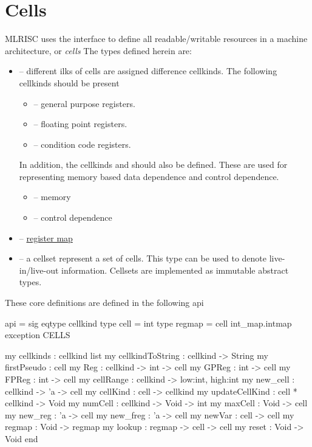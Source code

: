 \section{Cells}

MLRISC uses
the  
interface to define all readable/writable resources
in a machine architecture,  or \emph{cells} 
The types defined herein are:
\begin{itemize}
 \item {} -- different ilks of cells are assigned
   difference cellkinds.  The following cellkinds should be present
   \begin{itemize}
     \item {} -- general purpose registers.
     \item {} -- floating point registers.
     \item {} -- condition code registers.
   \end{itemize}
   In addition, the cellkinds  and 
   should also be defined.  These are used for representing
   memory based data dependence and control dependence.
   \begin{itemize}
     \item {} -- memory 
     \item {} -- control dependence
   \end{itemize} 
 \item {} -- \href{regmap.html}{register map}
 \item {} -- a cellset represent a set of cells.  This
   type can be used to denote live-in/live-out information.  Cellsets are
   implemented as immutable abstract types.
\end{itemize}

These core definitions are defined in the following api
\begin{SML}
api  =
sig
   eqtype cellkind 
   type cell = int
   type regmap = cell int_map.intmap
   exception CELLS

   my cellkinds : cellkind list 
   my cellkindToString : cellkind -> String
   my firstPseudo : cell                    
   my Reg   : cellkind -> int -> cell
   my GPReg : int -> cell 
   my FPReg : int -> cell
   my cellRange : cellkind -> {low:int, high:int}
   my new_cell   : cellkind -> 'a -> cell 
   my cellKind : cell -> cellkind         
   my updateCellKind : cell * cellkind -> Void        
   my numCell   : cellkind -> Void -> int              
   my maxCell   : Void -> cell
   my new_reg    : 'a -> cell              
   my new_freg   : 'a -> cell              
   my newVar    : cell -> cell
   my regmap    : Void -> regmap
   my lookup    : regmap -> cell -> cell
   my reset     : Void -> Void
end
\end{SML}

